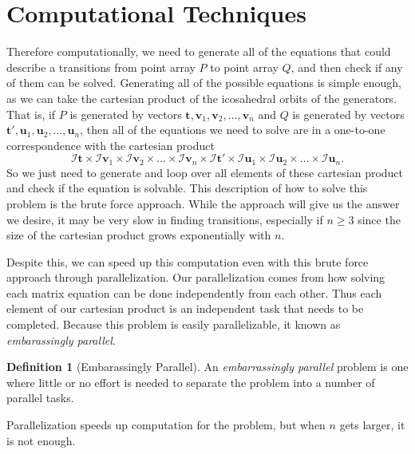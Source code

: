 \documentclass[a4paper,10pt]{article}
\theoremstyle{plain}
\theoremstyle{definition}
\newtheorem{Definition}[Theorem]{Definition}
\theoremstyle{remark}
\renewcommand{\vec}[1]{\mathbf{#1}}
\begin{document}
\section{Computational Techniques}
Therefore computationally, we need to generate all of the equations that could describe a transitions from point array \( P \) to point array \( Q \), and then check if any of them can be solved.
Generating all of the possible equations is simple enough, as we can take the cartesian product of the icosahedral orbits of the generators.
That is, if  \( P \) is generated by vectors \(\vec{t}, \vec{v}_1, \vec{v}_2, \dots, \vec{v}_n\) and \( Q \) is generated by vectors \(\vec{t'}, \vec{u}_1, \vec{u}_2, \dots, \vec{u}_n\), then all of the equations we need to solve are in a one-to-one correspondence with the cartesian product
\[\mathcal{I}\vec{t} \times \mathcal{I}\vec{v}_1 \times \mathcal{I}\vec{v}_2 \times \dots \times \mathcal{I}\vec{v}_n \times \mathcal{I}\vec{t'} \times \mathcal{I}\vec{u}_1 \times \mathcal{I}\vec{u}_2 \times \dots \times \mathcal{I}\vec{u}_n.\]
So we just need to generate and loop over all elements of these cartesian product and check if the equation is solvable.
This description of how to solve this problem is the brute force approach.
While the approach will give us the answer we desire, it may be very slow in finding transitions, especially if \( n \geq 3 \) since the size of the cartesian product grows exponentially with \( n \).

Despite this, we can speed up this computation even with this brute force approach through parallelization.
Our parallelization comes from how solving each matrix equation can be done independently from each other.
Thus each element of our cartesian product is an independent task that needs to be completed.
Because this problem is easily parallelizable, it known as \emph{embarassingly parallel}.
\begin{Definition}[Embarassingly Parallel]
	An \emph{embarrassingly parallel} problem is one where little or no effort is needed to separate the problem into a number of parallel tasks.
\end{Definition}
Parallelization speeds up computation for the problem, but when \( n \) gets larger, it is not enough.
\end{document}
